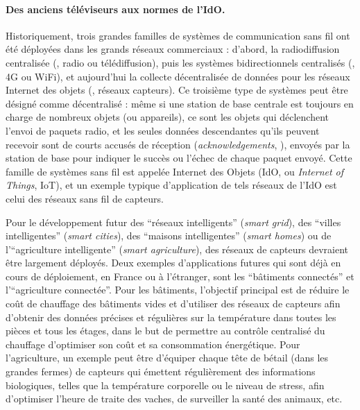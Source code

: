 \begin{resume_fr}
\paragraph{Des anciens téléviseurs aux normes de l'IdO.}
%
Historiquement, trois grandes familles de systèmes de communication sans fil ont été déployées dans les grands réseaux commerciaux : d'abord, la radiodiffusion centralisée (\eg, radio ou télédiffusion), puis les systèmes bidirectionnels centralisés (\eg, 4G ou WiFi), et aujourd'hui la collecte décentralisée de données pour les réseaux Internet des objets (\eg, réseaux capteurs).
%
Ce troisième type de systèmes peut être désigné comme décentralisé :
même si une station de base centrale est toujours en charge de nombreux objets (ou appareils),
ce sont les objets qui déclenchent l'envoi de paquets radio, et les seules données descendantes qu'ils peuvent recevoir sont de courts accusés de réception (\emph{acknowledgements}, \Ack), envoyés par la station de base pour indiquer le succès ou l'échec de chaque paquet envoyé.
Cette famille de systèmes sans fil est appelée Internet des Objets (IdO, ou \emph{Internet of Things}, IoT),
et un exemple typique d'application de tels réseaux de l'IdO est celui des réseaux sans fil de capteurs.

Pour le développement futur des ``réseaux intelligents'' (\emph{smart grid}), des ``villes intelligentes'' (\emph{smart cities}), des ``maisons intelligentes'' (\emph{smart homes}) ou de l'``agriculture intelligente'' (\emph{smart agriculture}), des réseaux de capteurs devraient être largement déployés.
Deux exemples d'applications futures qui sont déjà en cours de déploiement, en France ou à l'étranger, sont les ``bâtiments connectés'' et l'``agriculture connectée''.
Pour les bâtiments, l'objectif principal est de réduire le coût de chauffage des bâtiments vides et d'utiliser des réseaux de capteurs afin d'obtenir des données précises et régulières sur la température dans toutes les pièces et tous les étages, dans le but de permettre au contrôle centralisé du chauffage d'optimiser son coût et sa consommation énergétique.
Pour l'agriculture, un exemple peut être d'équiper chaque tête de bétail (dans les grandes fermes) de capteurs qui émettent régulièrement des informations biologiques, telles que la température corporelle ou le niveau de stress, afin d'optimiser l'heure de traite des vaches, de surveiller la santé des animaux, etc.



\end{resume_fr}

